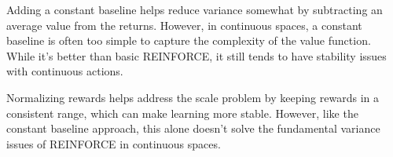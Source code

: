 \documentclass{article}
\begin{document}
Adding a constant baseline helps reduce variance somewhat by subtracting an average value from the returns. However, in continuous spaces, a constant baseline is often too simple to capture the complexity of the value function. While it's better than basic REINFORCE, it still tends to have stability issues with continuous actions.

Normalizing rewards helps address the scale problem by keeping rewards in a consistent range, which can make learning more stable. However, like the constant baseline approach, this alone doesn't solve the fundamental variance issues of REINFORCE in continuous spaces.






\end{document}
